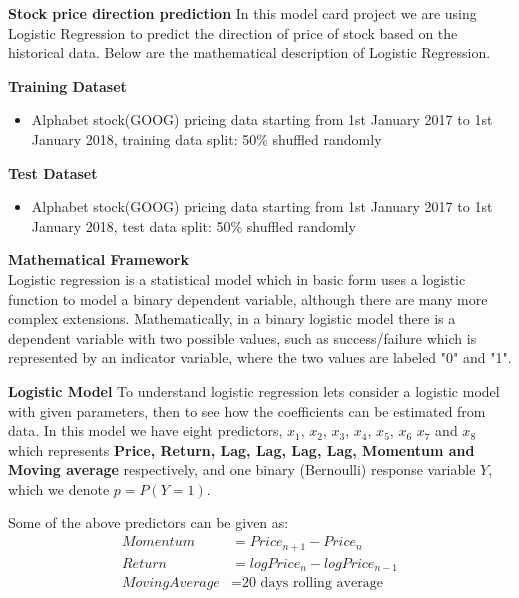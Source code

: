 \documentclass[11pt,english]{article}
\begin{document}
\begin{flushleft}
\textbf{Stock price direction prediction}
In this model card project we are using Logistic Regression to predict the direction of price of stock based on the historical data. Below are the mathematical description of Logistic Regression.\newline

\textbf{Training Dataset}
\begin{itemize}
 \addtolength{\itemindent}{.5cm}
    \item Alphabet stock(GOOG) pricing data starting from 1st January 2017 to 1st January 2018, training data split: 50\% shuffled randomly
\end{itemize}
\textbf{Test Dataset}
\begin{itemize}
 \addtolength{\itemindent}{.5cm}
    \item Alphabet stock(GOOG) pricing data starting from 1st January 2017 to 1st January 2018, test data split: 50\% shuffled randomly
\end{itemize}

\textbf{Mathematical Framework}\\
Logistic regression is a statistical model which in basic form uses a logistic function to model a binary dependent variable, although there are many more complex extensions.\newline
Mathematically, in a binary logistic model there is a dependent variable with two possible values, such as success/failure which is represented by an indicator variable, where the two values are labeled "0" and "1".\newline

\textbf{Logistic Model}
To understand logistic regression lets consider a logistic model with given parameters, then to see how the coefficients can be estimated from data. In this model we have eight predictors, $x_1$, $ x_2$, $ x_3$, $ x_4$,
$ x_5$, $ x_6$ $ x_7$ and $ x_8$ which represents \textbf{Price, Return, Lag, Lag, Lag, Lag, Momentum and Moving average} respectively, and one binary (Bernoulli) response variable $Y$, which we denote $ p=P(Y=1)$.\newline 

Some of the above predictors can be given as:
\begin{align}
    Momentum & = Price_{n+1} - Price_n \nonumber\\
    Return & = log Price_{n} - log Price_{n-1} \nonumber\\
    Moving Average & = \text{20 days rolling average} \nonumber
\end{align}


\end{flushleft}
\end{document}

